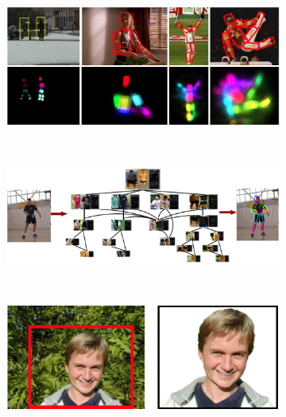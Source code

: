 \documentclass[10pt,twocolumn,letterpaper]{article}
\begin{document}
\begin{figure}
\begin{subfigure}[b]{0.42\textwidth}
		\caption{}
    		\label{fig:soa_mop}
 	\end{subfigure}
	\\
	\begin{subfigure}[b]{0.4\textwidth}
 		\includegraphics[width=1\textwidth]{pictures/stateoftheart/andriluka2009pictorial.eps} 			
		\caption{}
    		\label{fig:soa_ps}
 	\end{subfigure}
	~
	\begin{subfigure}[b]{0.55\textwidth}
 		\includegraphics[width=1\textwidth]{pictures/stateoftheart/wang2011learning.eps} 			
		\caption{}
    		\label{fig:soa_poselets}
 	\end{subfigure}
	\\
	\begin{subfigure}[b]{0.45\textwidth}
 		\includegraphics[width=1\textwidth]{pictures/stateoftheart/grabcut.eps} 			

\end{subfigure}
\end{figure}
\end{document}
